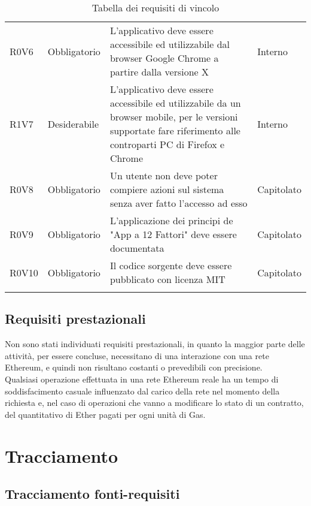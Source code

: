 \documentclass[AnalisiDeiRequisiti.tex]{subfiles}
\begin{document}
\begin{longtable}[H]{p{2.5cm}p{2.5cm}p{5cm}p{2cm}}
	R0V6 & Obbligatorio & L'applicativo deve essere accessibile ed utilizzabile dal browser Google Chrome a partire dalla versione X & Interno \\   %
	R1V7 & Desiderabile & L'applicativo deve essere accessibile ed utilizzabile da un browser mobile, per le versioni supportate fare riferimento alle controparti PC di Firefox e Chrome & Interno \\  
	R0V8 & Obbligatorio & Un utente non deve poter compiere azioni sul sistema senza aver fatto l'accesso ad esso & Capitolato \\  
	R0V9 & Obbligatorio & L'applicazione dei principi de "App a 12 Fattori" deve essere documentata & Capitolato \\  
	R0V10 & Obbligatorio & Il codice sorgente deve essere pubblicato con licenza MIT & Capitolato \\  
	\hiderowcolors
	\caption{Tabella dei requisiti di vincolo}
\end{longtable}

\subsection{Requisiti prestazionali}

Non sono stati individuati requisiti prestazionali, in quanto la maggior parte delle attività, per essere concluse, necessitano di una interazione con una rete Ethereum, e quindi non risultano costanti o prevedibili con precisione.\\
Qualsiasi operazione effettuata in una rete Ethereum reale ha un tempo di soddisfacimento casuale influenzato dal carico della rete nel momento della richiesta e, nel caso di operazioni che vanno a modificare lo stato di un contratto, del quantitativo di Ether pagati per ogni unità di Gas.\\
 
\section{Tracciamento}
\subsection{Tracciamento fonti-requisiti}

\label{table:Tabella di tracciamento fonti-requisiti}
\end{document}
